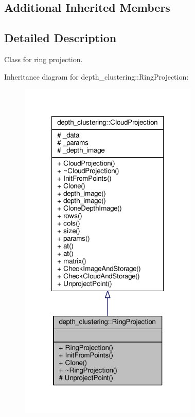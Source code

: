 \subsection*{Additional Inherited Members}


\subsection{Detailed Description}
Class for ring projection. 

Inheritance diagram for depth\-\_\-clustering\-:\-:Ring\-Projection\-:
\nopagebreak
\begin{figure}[H]
\begin{center}
\leavevmode
\includegraphics[width=242pt]{classdepth__clustering_1_1RingProjection__inherit__graph}
\end{center}
\end{figure}



